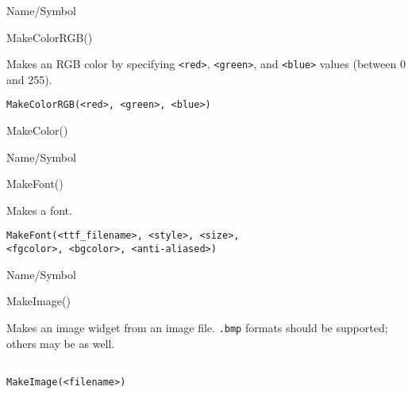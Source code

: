 \rl


\begin{desc}{Name/Symbol}
\item[Name/Symbol]	MakeColorRGB() 

\item[Description]	Makes an RGB color by specifying \verb+<red>+, \verb+<green>+, and 
		\verb+<blue>+ values (between 0 and 255).

\item[Usage]		
\begin{verbatim}
MakeColorRGB(<red>, <green>, <blue>)
\end{verbatim}

\item[Example]	

\item[See Also]	MakeColor()
\end{desc}

\rl





\begin{desc}{Name/Symbol}
\item[Name/Symbol]	MakeFont() 

\item[Description]	Makes a font.

\item[Usage]
\begin{verbatim}
MakeFont(<ttf_filename>, <style>, <size>, 
<fgcolor>, <bgcolor>, <anti-aliased>)
\end{verbatim}

\item[Example]	

\item[See Also]	
\end{desc}

\rl



\begin{desc}{Name/Symbol}
\item[Name/Symbol]	MakeImage()

\item[Description]	Makes an image widget from an image file.
		\texttt{.bmp} formats should be supported; others may be as well.

\item[Usage]		
\begin{verbatim}

MakeImage(<filename>)
\end{verbatim}

\item[Example]	

\item[See Also]	
\end{desc}

